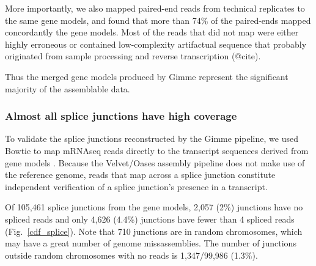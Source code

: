 \documentclass[10pt]{article}
\begin{document}
More importantly, we also mapped paired-end reads from technical replicates to
the same gene models, and found that more than 74\% of the paired-ends mapped
concordantly the gene models.  Most of the reads that did not map were either
highly erroneous or contained low-complexity artifactual sequence that probably
originated from sample processing and reverse transcription (@cite).


Thus the merged gene models produced by Gimme represent the significant majority
of the assemblable data.

\subsubsection*{Almost all splice junctions have high coverage}

To validate the splice junctions reconstructed by the Gimme pipeline,
we used Bowtie to map mRNAseq reads directly to the transcript sequences
derived from gene models \cite{Langmead:2009fv}.  Because the
Velvet/Oases assembly pipeline does not make use of the reference
genome, reads that map across a splice junction constitute independent
verification of a splice junction's presence in a transcript.

Of 105,461 splice junctions from the gene models, 2,057 (2\%) junctions have no
spliced reads and only 4,626 (4.4\%) junctions have fewer than 4 spliced reads
(Fig.~\ref{cdf_splice}).  Note that 710 junctions are in random chromosomes,
which may have a great number of genome missassemblies. The number of junctions
outside random chromosomes with no reads is 1,347/99,986 (1.3\%).

\end{document}
